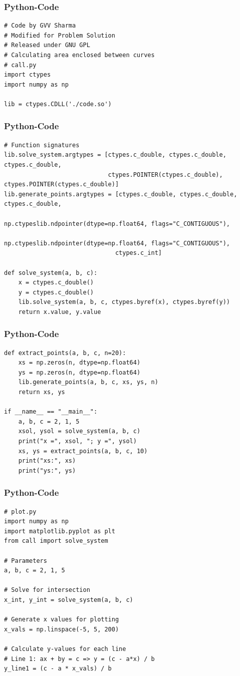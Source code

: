 \documentclass{beamer}
\begin{document}
\begin{frame}[fragile]
\frametitle{Python-Code}
\begin{lstlisting}
# Code by GVV Sharma
# Modified for Problem Solution
# Released under GNU GPL
# Calculating area enclosed between curves
# call.py
import ctypes
import numpy as np

lib = ctypes.CDLL('./code.so')
\end{lstlisting}
\end{frame}
\begin{frame}[fragile]
\frametitle{Python-Code}
\begin{lstlisting}
# Function signatures
lib.solve_system.argtypes = [ctypes.c_double, ctypes.c_double, ctypes.c_double,
                             ctypes.POINTER(ctypes.c_double), ctypes.POINTER(ctypes.c_double)]
lib.generate_points.argtypes = [ctypes.c_double, ctypes.c_double, ctypes.c_double,
                               np.ctypeslib.ndpointer(dtype=np.float64, flags="C_CONTIGUOUS"),
                               np.ctypeslib.ndpointer(dtype=np.float64, flags="C_CONTIGUOUS"),
                               ctypes.c_int]

def solve_system(a, b, c):
    x = ctypes.c_double()
    y = ctypes.c_double()
    lib.solve_system(a, b, c, ctypes.byref(x), ctypes.byref(y))
    return x.value, y.value
\end{lstlisting}
\end{frame}
\begin{frame}[fragile]
\frametitle{Python-Code}
\begin{lstlisting}
def extract_points(a, b, c, n=20):
    xs = np.zeros(n, dtype=np.float64)
    ys = np.zeros(n, dtype=np.float64)
    lib.generate_points(a, b, c, xs, ys, n)
    return xs, ys

if __name__ == "__main__":
    a, b, c = 2, 1, 5
    xsol, ysol = solve_system(a, b, c)
    print("x =", xsol, "; y =", ysol)
    xs, ys = extract_points(a, b, c, 10)
    print("xs:", xs)
    print("ys:", ys)
\end{lstlisting}
\end{frame}
\begin{frame}[fragile]
\frametitle{Python-Code}
\begin{lstlisting}
# plot.py
import numpy as np
import matplotlib.pyplot as plt
from call import solve_system

# Parameters
a, b, c = 2, 1, 5

# Solve for intersection
x_int, y_int = solve_system(a, b, c)

# Generate x values for plotting
x_vals = np.linspace(-5, 5, 200)

# Calculate y-values for each line
# Line 1: ax + by = c => y = (c - a*x) / b
y_line1 = (c - a * x_vals) / b
\end{lstlisting}
\end{frame}
\end{document}
